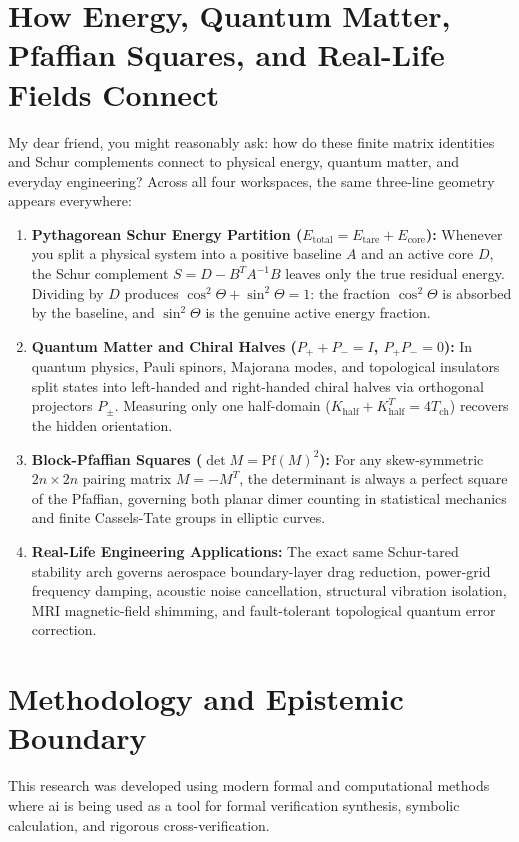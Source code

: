 \documentclass[11pt,a4paper]{article}
\theoremstyle{definition}
\begin{document}
\section{How Energy, Quantum Matter, Pfaffian Squares, and Real-Life Fields Connect}

My dear friend, you might reasonably ask: how do these finite matrix identities and Schur complements connect to physical energy, quantum matter, and everyday engineering? Across all four workspaces, the same three-line geometry appears everywhere:

\begin{enumerate}
  \item \textbf{Pythagorean Schur Energy Partition ($E_{\mathrm{total}} = E_{\mathrm{tare}} + E_{\mathrm{core}}$):} Whenever you split a physical system into a positive baseline $A$ and an active core $D$, the Schur complement $S = D - B^T A^{-1} B$ leaves only the true residual energy. Dividing by $D$ produces $\cos^2\Theta + \sin^2\Theta = 1$: the fraction $\cos^2\Theta$ is absorbed by the baseline, and $\sin^2\Theta$ is the genuine active energy fraction.
  \item \textbf{Quantum Matter and Chiral Halves ($P_+ + P_- = I$, $P_+ P_- = 0$):} In quantum physics, Pauli spinors, Majorana modes, and topological insulators split states into left-handed and right-handed chiral halves via orthogonal projectors $P_\pm$. Measuring only one half-domain ($K_{\mathrm{half}} + K_{\mathrm{half}}^T = 4 T_{\mathrm{ch}}$) recovers the hidden orientation.
  \item \textbf{Block-Pfaffian Squares ($\det M = \mathrm{Pf}(M)^2$):} For any skew-symmetric $2n \times 2n$ pairing matrix $M = -M^T$, the determinant is always a perfect square of the Pfaffian, governing both planar dimer counting in statistical mechanics and finite Cassels-Tate groups in elliptic curves.
  \item \textbf{Real-Life Engineering Applications:} The exact same Schur-tared stability arch governs aerospace boundary-layer drag reduction, power-grid frequency damping, acoustic noise cancellation, structural vibration isolation, MRI magnetic-field shimming, and fault-tolerant topological quantum error correction.
\end{enumerate}

\section{Methodology and Epistemic Boundary}
\noindent This research was developed using modern formal and computational methods where ai is being used as a tool for formal verification synthesis, symbolic calculation, and rigorous cross-verification.
\end{document}
